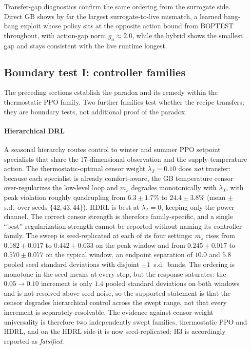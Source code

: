\documentclass{ieeeaccess}
\newcommand{\ms}{\ensuremath{m_s}}
\begin{document}
Transfer-gap diagnostics confirm the same ordering from the surrogate side. Direct GB shows by far
the largest surrogate-to-live mismatch, a learned bang-bang exploit whose policy sits at the
opposite action bound from BOPTEST throughout, with action-gap norm $g_a\approx2.0$, while the
hybrid shows the smallest gap and stays consistent with the live runtime longest.

\subsection{Boundary test I: controller families}\label{sec:families}

The preceding sections establish the paradox and its remedy within the thermostatic PPO family. Two
further families test whether the recipe transfers; they are boundary tests, not additional proof of
the paradox.

\paragraph{Hierarchical DRL}
A seasonal hierarchy routes control to winter and summer PPO setpoint specialists that share the
17-dimensional observation and the supply-temperature action. The thermostatic-optimal censor weight
$\lambda_T=0.10$ does \emph{not} transfer: because each specialist is already comfort-aware, the GB
temperature censor over-regularizes the low-level loop and \ms{} degrades monotonically with
$\lambda_T$, with peak violation roughly quadrupling from $6.3\pm1.7\%$ to $24.4\pm3.8\%$
(mean $\pm$ s.d.\ over seeds $\{42,43,44\}$). HDRL is best at
$\lambda_T=0$, keeping only the power channel. The correct censor strength is therefore
family-specific, and a single ``best'' regularization strength cannot be reported without naming its
controller family. The sweep is seed-replicated at each of its four settings: \ms{} rises from
$0.182\pm0.017$ to $0.442\pm0.033$ on the peak window and from $0.245\pm0.017$ to
$0.570\pm0.077$ on the typical window, an endpoint separation of $10.0$ and $5.8$ pooled seed
standard deviations with disjoint $\pm1$~s.d.\ bands. The ordering is monotone in the seed means at
every step, but the response saturates: the $0.05\rightarrow0.10$ increment is only $1.4$ pooled
standard deviations on both windows and is not resolved above seed noise, so the supported statement
is that the censor degrades hierarchical control across the swept range, not that every increment is
separately resolvable. The evidence against censor-weight universality is therefore two
independently swept families, thermostatic PPO and HDRL, and on the HDRL side it is now
seed-replicated; H3 is accordingly reported as \emph{falsified}.
\end{document}

